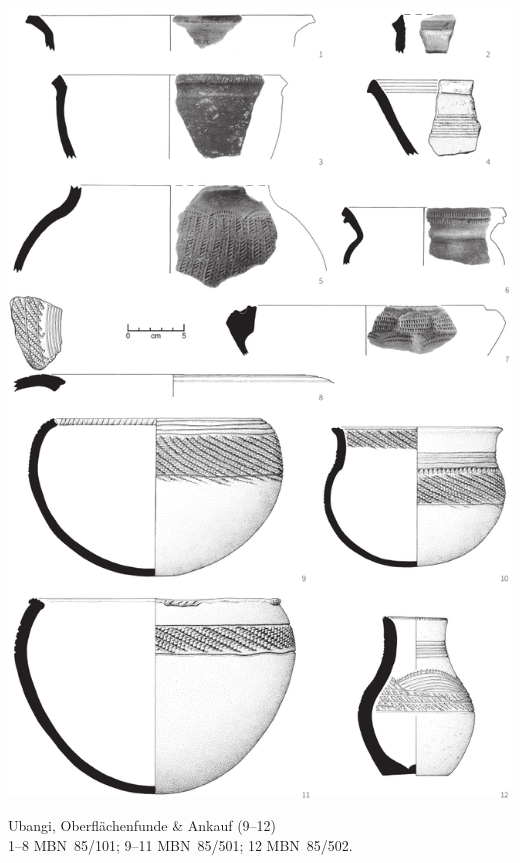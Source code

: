 \begin{pl}[H]
	\includegraphics{plt/Taf10.pdf}
	\vspace{.75em}\caption{\mbox{Ubangi}, Oberflächenfunde \& Ankauf (9--12) \\ 1--8 MBN~85/101; 9--11 MBN~85/501; 12 MBN~85/502.}
	\label{pl:10}
\end{pl}

